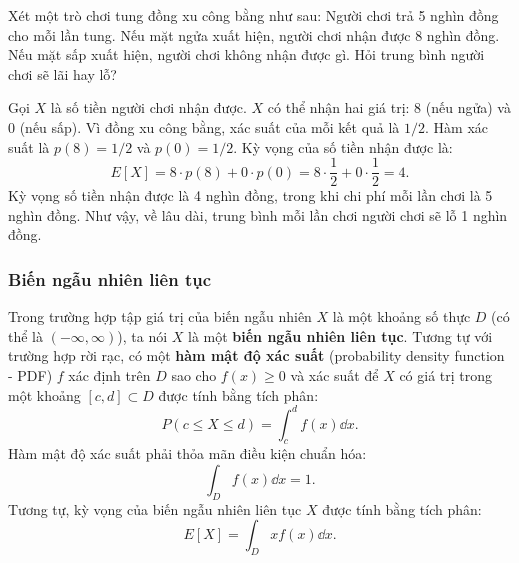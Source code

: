 \begin{example}
    Xét một trò chơi tung đồng xu công bằng như sau: Người chơi trả 5 nghìn đồng cho mỗi lần tung. Nếu mặt ngửa xuất hiện, người chơi nhận được 8 nghìn đồng. Nếu mặt sấp xuất hiện, người chơi không nhận được gì. Hỏi trung bình người chơi sẽ lãi hay lỗ?
\end{example}
\begin{solution}
    Gọi $X$ là số tiền người chơi nhận được. $X$ có thể nhận hai giá trị: $8$ (nếu ngửa) và $0$ (nếu sấp). Vì đồng xu công bằng, xác suất của mỗi kết quả là $1/2$.
    Hàm xác suất là $p(8) = 1/2$ và $p(0) = 1/2$.
    Kỳ vọng của số tiền nhận được là:
    \[ E[X] = 8 \cdot p(8) + 0 \cdot p(0) = 8 \cdot \dfrac{1}{2} + 0 \cdot \dfrac{1}{2} = 4. \]
    Kỳ vọng số tiền nhận được là 4 nghìn đồng, trong khi chi phí mỗi lần chơi là 5 nghìn đồng. Như vậy, về lâu dài, trung bình mỗi lần chơi người chơi sẽ lỗ 1 nghìn đồng.
\end{solution}

\subsubsection{Biến ngẫu nhiên liên tục}
Trong trường hợp tập giá trị của biến ngẫu nhiên $X$ là một khoảng số thực $D$ (có thể là $(-\infty, \infty)$), ta nói $X$ là một \textbf{biến ngẫu nhiên liên tục}. Tương tự với trường hợp rời rạc, có một \textbf{hàm mật độ xác suất} (probability density function - PDF) $f$ xác định trên $D$ sao cho $f(x) \ge 0$ và xác suất để $X$ có giá trị trong một khoảng $[c, d] \subset D$ được tính bằng tích phân:
\[ P(c \le X \le d) = \int_c^d f(x) \dd x. \]
Hàm mật độ xác suất phải thỏa mãn điều kiện chuẩn hóa:
\[ \int_D f(x) \dd x = 1. \]
Tương tự, kỳ vọng của biến ngẫu nhiên liên tục $X$ được tính bằng tích phân:
\[ E[X] = \int_D x f(x) \dd x. \]

